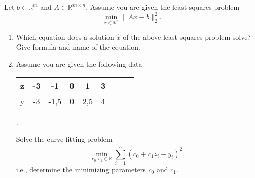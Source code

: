 Let $b \in \mathbb{R}^m$ and $A \in \mathbb{R}^{m\times n}$.
Assume you are given the least squares problem 
$$
\min\limits_{x \in \mathbb{R}^n } \| Ax - b \|_2^2.
$$
\begin{enumerate}
	\item Which equation does a solution $\hat{x}$ of the above least squares problem solve? Give formula and name of the equation.
	\item Assume you are given the following data
	\begin{center}
	\begin{tabular}{|l|c|c|c|c|c|c||c|c|}\hline
	z&-3&-1&0&1&3\\ 
	\hline
	y&-3&-1,5&0&2,5&4\\
	\hline
\end{tabular}.
	\end{center}
	Solve the curve fitting problem
	$$
	\min\limits_{c_0, c_1 \in \mathbb{R}} \sum_{i=1}^5 (c_0 + c_1z_i - y_i)^2,
	$$
	i.e., determine the minimizing parameters $c_0$ and $c_1$.
\end{enumerate}

 